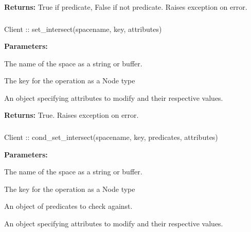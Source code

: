 \noindent\textbf{Returns:}
True if predicate, False if not predicate.  Raises exception on error.

\subsubsection{}
\label{api:nodejs:set_intersect}
\begin{javascriptcode}
Client :: set_intersect(spacename, key, attributes)
\end{javascriptcode}


\noindent\textbf{Parameters:}
\begin{description}[labelindent=\widthof{{\code{attributes}}},leftmargin=*,noitemsep,nolistsep,align=right]
\item[\code{spacename}] The name of the space as a string or buffer.
\item[\code{key}] The key for the operation as a Node type
\item[\code{attributes}] An object specifying attributes to modify and their respective values.
\end{description}

\noindent\textbf{Returns:}
True.  Raises exception on error.

\subsubsection{}
\label{api:nodejs:cond_set_intersect}
\begin{javascriptcode}
Client :: cond_set_intersect(spacename, key, predicates, attributes)
\end{javascriptcode}


\noindent\textbf{Parameters:}
\begin{description}[labelindent=\widthof{{\code{predicates}}},leftmargin=*,noitemsep,nolistsep,align=right]
\item[\code{spacename}] The name of the space as a string or buffer.
\item[\code{key}] The key for the operation as a Node type
\item[\code{predicates}] An object of predicates to check against.
\item[\code{attributes}] An object specifying attributes to modify and their respective values.
\end{description}

